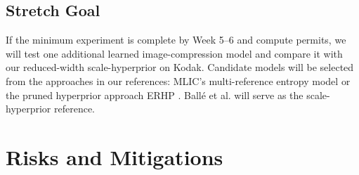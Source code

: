 \documentclass[11pt]{article}
\begin{document}
\subsection{Stretch Goal}
If the minimum experiment is complete by Week 5--6 and compute permits,
we will test one additional learned image-compression model and compare
it with our reduced-width scale-hyperprior on Kodak. Candidate models
will be selected from the approaches in our references: MLIC's
multi-reference entropy model \citep{jiang2023mlic} or the pruned
hyperprior approach ERHP \citep{luo2022erhp}. Ball\'e et al.
\citep{balle2018scalehyperprior} will serve as the scale-hyperprior
reference.

\section{Risks and Mitigations}
\end{document}
